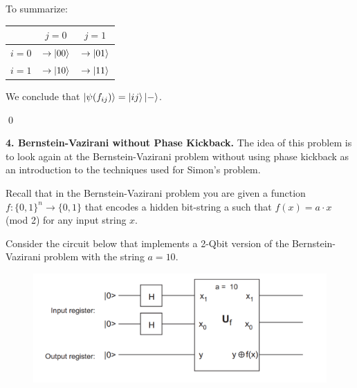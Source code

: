 \documentclass{book}
\theoremstyle{definition}
\begin{document}
\begin{enumerate}[(a)]
	To summarize:
	\begin{center}
	\begin{tabular}{|c|c|c|}
		\hline
			& $j=0$ & $j=1$ \\
		\hline
		$i=0$ & $\to\ket{00}$ &  $\to\ket{01}$\\
		\hline
		$i=1$ & $\to\ket{10}$ & $\to\ket{11}$ \\
		\hline
	\end{tabular}
	\end{center}

	We conclude that $\ket{\psi (f_{ij})} = \ket{ij}\ket{-}$.
	
\end{enumerate}







\qed



\newpage

\noindent \textbf{4. Bernstein-Vazirani without Phase Kickback.}  The idea of this problem is to look again
at the Bernstein-Vazirani problem without using phase kickback as an introduction to the
techniques used for Simon’s problem. 

Recall that in the Bernstein-Vazirani problem you are given a function $f : \{0, 1\}^n \to \{0, 1\}$ that encodes a hidden bit-string a such that $f(x) = a \cdot x$ (mod 2) for any input string $x$.

Consider the circuit below that implements a 2-Qbit version of the Bernstein-Vazirani problem
with the string $a = 10$.

\begin{figure}[!htb]
	\centering
	\includegraphics[scale=0.25]{phase4}
\end{figure}
\end{document}
